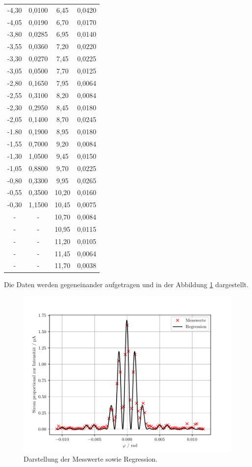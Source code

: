 \begin{table}[H]
\begin{tabular}{c c c c}
    -4,30 & 0,0100 & 6,45 & 0,0420\\
    -4,05 & 0,0190 & 6,70 & 0,0170\\
    -3,80 & 0,0285 & 6,95 & 0,0140\\
    -3,55 & 0,0360 & 7,20 & 0,0220\\
    -3,30 & 0,0270 & 7,45 & 0,0225\\
    -3,05 & 0,0500 & 7,70 & 0,0125\\
    -2,80 & 0,1650 & 7,95 & 0,0064\\
    -2,55 & 0,3100 & 8,20 & 0,0084\\
    -2,30 & 0,2950 & 8,45 & 0,0180\\
    -2,05 & 0,1400 & 8,70 & 0,0245\\
    -1.80 & 0,1900 & 8,95 & 0,0180\\
    -1,55 & 0,7000 & 9,20 & 0,0084\\
    -1,30 & 1,0500 & 9,45 & 0,0150\\
    -1,05 & 0,8800 & 9,70 & 0,0225\\
    -0,80 & 0,3300 & 9,95 & 0,0265\\
    -0,55 & 0,3500 & 10,20& 0,0160\\
    -0,30 & 1,1500 & 10,45& 0,0075\\
        - &   -    & 10,70& 0,0084\\
        - &   -    & 10,95& 0,0115\\
        - &   -    & 11,20& 0,0105\\
        - &   -    & 11,45& 0,0064\\
        - &   -    & 11,70& 0,0038\\
    \bottomrule
  \end{tabular}
\end{table}
Die Daten werden gegeneinander aufgetragen und in der Abbildung \ref{abb:6} dargestellt.
\begin{figure}[H]
  \centering
  \includegraphics{plot3.pdf}
  \caption{Darstellung der Messwerte sowie Regression.}
  \label{abb:6}
\end{figure}
